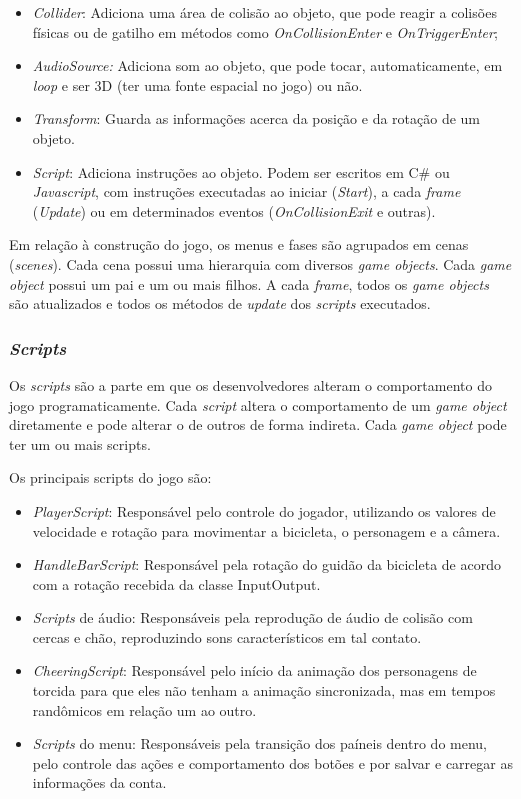 \begin{itemize}
\item \textit{Collider}: Adiciona uma área de colisão ao objeto, que pode reagir a colisões físicas ou de gatilho em métodos como \textit{OnCollisionEnter} e \textit{OnTriggerEnter};
\item \textit{AudioSource:} Adiciona som ao objeto, que pode tocar, automaticamente, em \textit{loop} e ser 3D (ter uma fonte espacial no jogo) ou não.
\item \textit{Transform}: Guarda as informações acerca da posição e da rotação de um objeto.
\item \textit{Script}: Adiciona instruções ao objeto. Podem ser escritos em C\# ou \textit{Javascript}, com instruções executadas ao iniciar (\textit{Start}), a cada \textit{frame} (\textit{Update}) ou em determinados eventos (\textit{OnCollisionExit} e outras).
\end{itemize}

Em relação à construção do jogo, os menus e fases são agrupados em cenas (\textit{scenes}). Cada cena possui uma hierarquia com diversos \textit{game objects}. Cada \textit{game object} possui um pai e um ou mais filhos. A cada \textit{frame}, todos os \textit{game objects} são atualizados e todos os métodos de \textit{update} dos \textit{scripts} executados.

\subsubsection{\textit{Scripts}}

Os \textit{scripts} são a parte em que os desenvolvedores alteram o comportamento do jogo programaticamente. Cada \textit{script} altera o comportamento de um \textit{game object} diretamente e pode alterar o de outros de forma indireta. Cada \textit{game object} pode ter um ou mais scripts.

Os principais scripts do jogo são:

\begin{itemize}
\item \textit{PlayerScript}: Responsável pelo controle do jogador, utilizando os valores de velocidade e rotação para movimentar a bicicleta, o personagem e a câmera.
\item \textit{HandleBarScript}: Responsável pela rotação do guidão da bicicleta de acordo com a rotação recebida da classe InputOutput.
\item \textit{Scripts} de áudio: Responsáveis pela reprodução de áudio de colisão com cercas e chão, reproduzindo sons característicos em tal contato.
\item \textit{CheeringScript}: Responsável pelo início da animação dos personagens de torcida para que eles não tenham a animação sincronizada, mas em tempos randômicos em relação um ao outro.
\item \textit{Scripts} do menu: Responsáveis pela transição dos paíneis dentro do menu, pelo controle das ações e comportamento dos botões e por salvar e carregar as informações da conta.
\end{itemize}

